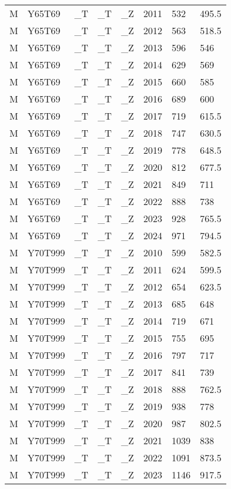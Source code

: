 \begin{longtable}[t]{llllllll}
M & Y65T69 & \_T & \_T & \_Z & 2011 & 532 & 495.5\\
M & Y65T69 & \_T & \_T & \_Z & 2012 & 563 & 518.5\\
M & Y65T69 & \_T & \_T & \_Z & 2013 & 596 & 546\\
M & Y65T69 & \_T & \_T & \_Z & 2014 & 629 & 569\\
\addlinespace
M & Y65T69 & \_T & \_T & \_Z & 2015 & 660 & 585\\
M & Y65T69 & \_T & \_T & \_Z & 2016 & 689 & 600\\
M & Y65T69 & \_T & \_T & \_Z & 2017 & 719 & 615.5\\
M & Y65T69 & \_T & \_T & \_Z & 2018 & 747 & 630.5\\
M & Y65T69 & \_T & \_T & \_Z & 2019 & 778 & 648.5\\
\addlinespace
M & Y65T69 & \_T & \_T & \_Z & 2020 & 812 & 677.5\\
M & Y65T69 & \_T & \_T & \_Z & 2021 & 849 & 711\\
M & Y65T69 & \_T & \_T & \_Z & 2022 & 888 & 738\\
M & Y65T69 & \_T & \_T & \_Z & 2023 & 928 & 765.5\\
M & Y65T69 & \_T & \_T & \_Z & 2024 & 971 & 794.5\\
\addlinespace
M & Y70T999 & \_T & \_T & \_Z & 2010 & 599 & 582.5\\
M & Y70T999 & \_T & \_T & \_Z & 2011 & 624 & 599.5\\
M & Y70T999 & \_T & \_T & \_Z & 2012 & 654 & 623.5\\
M & Y70T999 & \_T & \_T & \_Z & 2013 & 685 & 648\\
M & Y70T999 & \_T & \_T & \_Z & 2014 & 719 & 671\\
\addlinespace
M & Y70T999 & \_T & \_T & \_Z & 2015 & 755 & 695\\
M & Y70T999 & \_T & \_T & \_Z & 2016 & 797 & 717\\
M & Y70T999 & \_T & \_T & \_Z & 2017 & 841 & 739\\
M & Y70T999 & \_T & \_T & \_Z & 2018 & 888 & 762.5\\
M & Y70T999 & \_T & \_T & \_Z & 2019 & 938 & 778\\
\addlinespace
M & Y70T999 & \_T & \_T & \_Z & 2020 & 987 & 802.5\\
M & Y70T999 & \_T & \_T & \_Z & 2021 & 1039 & 838\\
M & Y70T999 & \_T & \_T & \_Z & 2022 & 1091 & 873.5\\
M & Y70T999 & \_T & \_T & \_Z & 2023 & 1146 & 917.5\\

\end{longtable}
